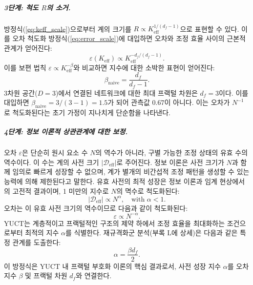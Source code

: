 \documentclass[11pt,a4paper]{article}
\newcommand{\Ke}{K_{\mathrm{eff}}}
\theoremstyle{remark}
\begin{document}
	\subparagraph*{3단계: 척도 \(R\)의 소거.}
	방정식(\ref{eq:keff_scale})으로부터 계의 크기를 \(R \propto \Ke^{1/(d_f-1)}\)으로 표현할 수 있다. 이를 오차 척도화 방정식(\ref{eq:error_scale})에 대입하면 오차와 조정 효율 사이의 근본적 관계가 얻어진다:
	\begin{equation}
		\varepsilon(\Ke) \propto \Ke^{-d_f/(d_f-1)}.
		\label{eq:error_keff_naive}
	\end{equation}
	이를 보편 법칙 \(\varepsilon \propto \Ke^{-\beta}\)와 비교하면 지수에 대한 소박한 표현이 얻어진다:
	\begin{equation}
		\beta_{\text{naive}} = \frac{d_f}{d_f-1}.
		\label{eq:beta_naive}
	\end{equation}
	3차원 공간(\(D = 3\))에서 연결된 네트워크에 대한 최대 프랙털 차원은 \(d_f = 3\)이다. 이를 대입하면 \(\beta_{\text{naive}} = 3/(3-1) = 1.5\)가 되어 관측값 \(0.67\)이 아니다. 이는 오차가 \(N^{-1}\)로 척도화된다는 초기 가정이 지나치게 단순함을 나타낸다.
	
	\subparagraph*{4단계: 정보 이론적 상관관계에 대한 보정.}
	오차 \(\varepsilon\)은 단순히 원시 요소 수 \(N\)의 역수가 아니라, 구별 가능한 조정 상태의 유효 수의 역수이다. 이 수는 계의 사전 크기 \(|\mathcal{D}_{\text{eff}}|\)로 주어진다. 정보 이론은 사전 크기가 \(N\)과 함께 임의로 빠르게 성장할 수 없으며, 계가 별개의 비간섭적 조정 패턴을 생성할 수 있는 능력에 의해 제한된다고 말한다. 유효 사전의 최적 성장은 정보 이론과 임계 현상에서의 고전적 결과이며, 1 미만의 지수로 \(N\)의 멱수로 척도화된다:
	\begin{equation}
		|\mathcal{D}_{\text{eff}}| \propto N^{\alpha}, \quad \text{with } \alpha < 1.
		\label{eq:dict_scale}
	\end{equation}
	오차는 이 유효 사전 크기의 역수이므로 다음과 같이 척도화된다:
	\begin{equation}
		\varepsilon \propto N^{-\alpha}.
		\label{eq:error_scale_corrected}
	\end{equation}
	YUCT는 계층적이고 프랙털적인 구조의 제약 하에서 조정 효율을 최대화하는 조건으로부터 최적의 지수 \(\alpha\)를 식별한다. 재규격화군 분석(부록 L에 상세)은 다음과 같은 특정 관계를 도출한다:
	\begin{equation}
		\alpha = \frac{\beta d_f}{2}.
		\label{eq:alpha_from_beta}
	\end{equation}
	이 방정식은 YUCT 내 프랙털 부호화 이론의 핵심 결과로서, 사전 성장 지수 \(\alpha\)를 오차 지수 \(\beta\) 및 프랙털 차원 \(d_f\)와 연결한다.
	
\end{document}
